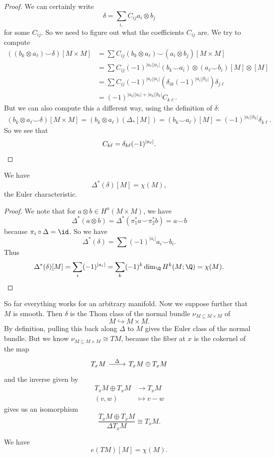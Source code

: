 \documentclass[a4paper]{article}
\theoremstyle{definition}
\begin{document}
\begin{proof}
  We can certainly write
  \[
    \delta = \sum_{i, } C_{ij} a_i \otimes b_j
  \]
  for some $C_{ij}$. So we need to figure out what the coefficients $C_{ij}$ are. We try to compute
  \begin{align*}
    ((b_k \otimes a_\ell) \smile \delta)[M \times M] &= \sum C_{ij} (b_k \otimes a_\ell) \smile (a_i \otimes b_j) [M \times M]\\
    &= \sum C_{ij} (-1)^{|a_\ell||a_i|} (b_k \smile a_i) \otimes (a_\ell \smile b_i) [M] \otimes [M]\\
    &= \sum C_{ij} (-1)^{|a_\ell||a_i|} (\delta_{ik}(-1)^{|a_i||b_k|}) \delta_{j \ell}\\
    &= (-1)^{|a_k||a_\ell| + |a_k| |b_k|} C_{k\ell}.
  \end{align*}
  But we can also compute this a different way, using the definition of $\delta$:
  \begin{align*}
    (b_k \otimes a_\ell \smile \delta)[M \times M] = (b_k \otimes a_\ell)(\Delta_*[M]) = (b_k \smile a_\ell)[M] = (-1)^{|a_\ell||b_k|} \delta_{k\ell}.
  \end{align*}
  So we see that
  \[
    C_{k\ell} = \delta_{k\ell}(-1)^{|a_\ell|}.\qedhere
  \]
\end{proof}

\begin{cor}
  We have
  \[
    \Delta^*(\delta)[M] = \chi(M),
  \]
  the Euler characteristic.
\end{cor}

\begin{proof}
  We note that for $a \otimes b \in H^n(M \times M)$, we have
  \[
    \Delta^*(a \otimes b) = \Delta^*(\pi_1^* a \smile \pi_2^* b) = a \smile b
  \]
  because $\pi_i \circ \Delta = \id$. So we have
  \[
    \Delta^*(\delta) = \sum (-1)^{|a_i|} a_i \smile b_i.
  \]
  Thus
  \[
    \Delta^*(\delta)[M] = \sum_i (-1)^{|a_i|} = \sum_k (-1)^k \dim_\Q H^k(M; \Q) = \chi(M).\qedhere
  \]
\end{proof}

So far everything works for an arbitrary manifold. Now we suppose further that $M$ is smooth. Then $\delta$ is the Thom class of the normal bundle $\nu_{M \subseteq M \times M}$ of
\[
  M \hookrightarrow M \times M.
\]
By definition, pulling this back along $\Delta$ to $M$ gives the Euler class of the normal bundle. But we know $\nu_{M \subseteq M \times M} \cong TM$, because the fiber at $x$ is the cokernel of the map
\[
  \begin{tikzcd}
    T_x M \ar[r, "\Delta"] & T_x M \oplus T_x M
  \end{tikzcd}
\]
and the inverse given by
\begin{align*}
  T_x M \oplus T_x M &\to T_x M\\
  (v, w) &\mapsto v - w
\end{align*}
gives us an isomorphism
\[
  \frac{T_x M \oplus T_x M}{\Delta T_x M} \cong T_x M.
\]
\begin{cor}
  We have
  \[
    e(TM)[M] = \chi(M).
  \]
\end{cor}
\end{document}
